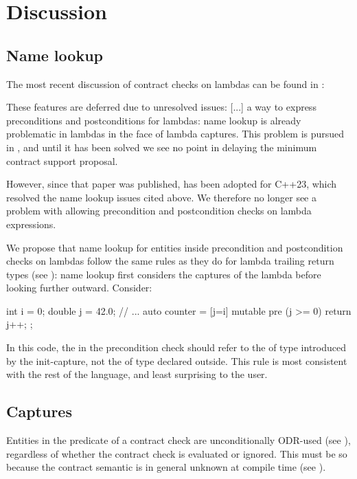 \section{Discussion}
\subsection{Name lookup}

The most recent discussion of contract checks on lambdas can be found in \cite{P2388R4}:

\pagebreak

\begin{adjustwidth}{0.5cm}{0.5cm}
These features are deferred due to unresolved issues: [...] a way to express preconditions and postconditions for lambdas: name lookup is already problematic in lambdas in the face of lambda captures. This problem is pursued in \cite{P2036R1}, and until it has been solved we see no point in delaying the minimum contract support proposal.
\end{adjustwidth}

However, since that paper was published, \cite{P2036R3} has been adopted for C++23, which resolved the name lookup issues cited above. We therefore no longer see a problem with allowing precondition and postcondition checks on lambda expressions.

We propose that name lookup for entities inside precondition and postcondition checks on lambdas follow the same rules as they do for lambda trailing return types (see \cite{P2036R3}): name lookup first considers the captures of the lambda before looking further outward. Consider:

\begin{codeblock}
int i = 0;
double j = 42.0;
// ...
auto counter = [j=i] mutable pre (j >= 0) {
  return j++;
};
\end{codeblock}

In this code, the  in the precondition check should refer to the  of type  introduced by the init-capture, not the  of type  declared outside. This rule is most consistent with the rest of the language, and least surprising to the user.

\subsection{Captures}

Entities in the predicate of a contract check are unconditionally ODR-used (see \cite{P2900R1}), regardless of whether the contract check is evaluated or ignored. This must be so because the contract semantic is in general unknown at compile time (see \cite{P2877R0}).

